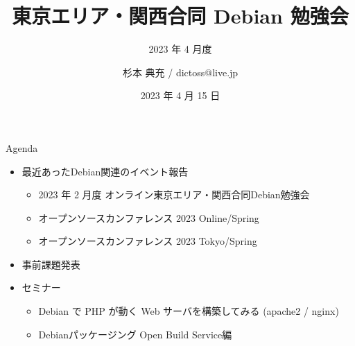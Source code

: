 \title{東京エリア・関西合同 Debian 勉強会}
\subtitle{2023 年 4 月度} %
\author{杉本 典充 / dictoss@live.jp}
\date{2023 年 4 月 15 日}



\begin{frame}
\titlepage{}
\end{frame}

\begin{frame}{Agenda}
 \begin{minipage}[t]{0.45\hsize}
  \begin{itemize}
  \item 最近あったDebian関連のイベント報告
    \begin{itemize}
    \item 2023 年 2 月度 オンライン東京エリア・関西合同Debian勉強会
    \item オープンソースカンファレンス 2023 Online/Spring
    \item オープンソースカンファレンス 2023 Tokyo/Spring
    \end{itemize}
  \item 事前課題発表
  \end{itemize}
 \end{minipage}
 \begin{minipage}[t]{0.45\hsize}
   \begin{itemize}
   \item セミナー
     \begin{itemize}
     \item Debian で PHP が動く Web サーバを構築してみる (apache2 / nginx)
     \item Debianパッケージング Open Build Service編
     \end{itemize}
  \end{itemize}
 \end{minipage}
\end{frame}

